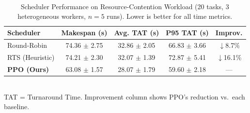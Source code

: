 \begin{table}[htbp]
\centering
\caption{Scheduler Performance on Resource-Contention Workload (20 tasks, 3 heterogeneous workers, $n=5$ runs). Lower is better for all time metrics.}
\label{tab:scheduler-results}
\begin{tabular}{lcccc}
\toprule
\textbf{Scheduler} & \textbf{Makespan (s)} & \textbf{Avg. TAT (s)} & \textbf{P95 TAT (s)} & \textbf{Improv.} \\
\midrule
Round-Robin & 74.36 $\pm$ 2.75 & 32.86 $\pm$ 2.05 & 66.83 $\pm$ 3.66 & $\downarrow$8.7\% \\
RTS (Heuristic) & 74.21 $\pm$ 2.30 & 32.07 $\pm$ 1.39 & 72.87 $\pm$ 5.41 & $\downarrow$16.1\% \\
\textbf{PPO (Ours)} & 63.08 $\pm$ 1.57 & 28.07 $\pm$ 1.79 & 59.60 $\pm$ 2.18 & --- \\
\bottomrule
\end{tabular}
\vspace{1mm}\\
\footnotesize{TAT = Turnaround Time. Improvement column shows PPO's reduction vs.\ each baseline.}
\end{table}

